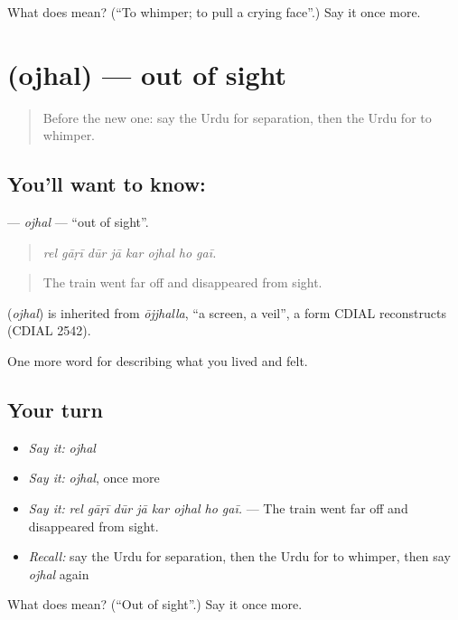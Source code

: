 \begin{tcolorbox}[breakable,colback=teal!4,colframe=teal!35!black,title={Before you move on}]
What does  mean? (\textquotedblleft{}To whimper; to pull a crying face\textquotedblright{}.) Say it once more.
\end{tcolorbox}
\section[\texorpdfstring{\ur{اوجھل} (ojhal)}{اوجھل (ojhal)}]{ (ojhal) — out of sight}

\label{lesson:UR-C450-ojhal}



\begin{quote}
Before the new one: say the Urdu for separation, then the Urdu for to whimper.
\end{quote}

\subsection*{You'll want to know: }
\textbf{} — \emph{ojhal} — \textquotedblleft{}out of sight\textquotedblright{}.

\begin{quote}
       
\end{quote}

\begin{quote}
\emph{rel gāṛī dūr jā kar ojhal ho gaī.}
\end{quote}

\begin{quote}
The train went far off and disappeared from sight.
\end{quote}

\begin{cousinweb}
\textbf{} (\emph{ojhal}) is inherited from \emph{ōjjhalla}, \textquotedblleft{}a screen, a veil\textquotedblright{}, a form CDIAL reconstructs (CDIAL 2542).
\end{cousinweb}

\begin{grammarlens}[title={What you've built}]
One more word for describing what you lived and felt.
\end{grammarlens}

\subsection*{Your turn}
\begin{itemize}
\raggedright
  \item \emph{Say it:} \emph{ojhal}
  \item \emph{Say it:} \emph{ojhal}, once more
  \item \emph{Say it:} \emph{rel gāṛī dūr jā kar ojhal ho gaī.} — The train went far off and disappeared from sight.
  \item \emph{Recall:} say the Urdu for separation, then the Urdu for to whimper, then say \emph{ojhal} again
\end{itemize}

\begin{tcolorbox}[breakable,colback=teal!4,colframe=teal!35!black,title={Before you move on}]
What does  mean? (\textquotedblleft{}Out of sight\textquotedblright{}.) Say it once more.
\end{tcolorbox}
